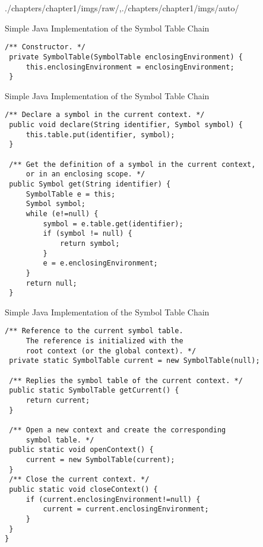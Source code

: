 \begin{graphicspathcontext}{{./chapters/chapter1/imgs/raw/},{./chapters/chapter1/imgs/auto/}}
\begin{bibunit}[apalike]
\begin{frame}[t,fragile]{{Simple Java Implementation} of the Symbol Table Chain}
\begin{lstlisting}[style=lststyle-java]
 /** Constructor. */
 private SymbolTable(SymbolTable enclosingEnvironment) {
     this.enclosingEnvironment = enclosingEnvironment;
 }
	\end{lstlisting}
\end{frame}

\begin{frame}[t,fragile]{{Simple Java Implementation} of the Symbol Table Chain}
	\begin{lstlisting}[style=lststyle-java]
 /** Declare a symbol in the current context. */
 public void declare(String identifier, Symbol symbol) {
     this.table.put(identifier, symbol);
 }

 /** Get the definition of a symbol in the current context,
     or in an enclosing scope. */
 public Symbol get(String identifier) {
     SymbolTable e = this;
     Symbol symbol;
     while (e!=null) {
         symbol = e.table.get(identifier);
         if (symbol != null) {
             return symbol;
         }
         e = e.enclosingEnvironment;
     }
     return null;
 }
	\end{lstlisting}
\end{frame}

\begin{frame}[t,fragile]{{Simple Java Implementation} of the Symbol Table Chain}
	\begin{lstlisting}[style=lststyle-java]
 /** Reference to the current symbol table.
     The reference is initialized with the
     root context (or the global context). */
 private static SymbolTable current = new SymbolTable(null);

 /** Replies the symbol table of the current context. */
 public static SymbolTable getCurrent() {
     return current;
 }

 /** Open a new context and create the corresponding
     symbol table. */
 public static void openContext() {
     current = new SymbolTable(current);
 }
 /** Close the current context. */
 public static void closeContext() {
     if (current.enclosingEnvironment!=null) {
         current = current.enclosingEnvironment;
     }
 }
}
	\end{lstlisting}
\end{frame}


\end{bibunit}
\end{graphicspathcontext}
